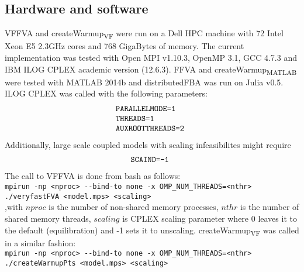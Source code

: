 \subsection*{Hardware and software}
VFFVA and createWarmup\textsubscript{VF} were run on a Dell HPC machine with 72 Intel Xeon E5 2.3GHz cores and 768 GigaBytes of memory. The current implementation was tested with Open MPI v1.10.3, OpenMP 3.1, GCC 4.7.3 and IBM ILOG CPLEX academic version (12.6.3). FFVA and createWarmup\textsubscript{MATLAB} were tested with MATLAB 2014b and distributedFBA was run on Julia v0.5. ILOG CPLEX was called with the following parameters:
\begin{equation*} \label{eq:one}
\begin{array}{ll@{}ll}
\texttt{PARALLELMODE=1} &\\
\texttt{THREADS=1} &\\
\texttt{AUXROOTTHREADS=2} &\\
\end{array}
\end{equation*}
Additionally, large scale coupled models with scaling infeasibilites might require 
\begin{equation*} \label{eq:one}
\begin{array}{ll@{}ll}
\texttt{SCAIND=-1} &\\
\end{array}
\end{equation*}
The call to VFFVA is done from bash as follows:\\
\texttt{mpirun -np \textless nproc\textgreater \hspace{0.1cm} -\hspace{0.05cm}-bind-to none -x OMP\_NUM\_THREADS=\textless nthr\textgreater \hspace{0.1cm} ./veryfastFVA \textless model.mps\textgreater \hspace{0.1cm} \textless scaling\textgreater}\\
,with $nproc$ is the number of non-shared memory processes, $nthr$ is the number of shared memory threads, $scaling$ is CPLEX scaling parameter where 0 leaves it to the default (equilibration) and -1 sets it to unscaling. createWarmup\textsubscript{VF} was called in a similar fashion:\\
\texttt{mpirun -np \textless nproc\textgreater \hspace{0.1cm}  -\hspace{0.05cm}-bind-to none -x OMP\_NUM\_THREADS=\textless nthr\textgreater \hspace{0.1cm}\\ ./createWarmupPts \textless model.mps\textgreater \hspace{0.1cm} \textless scaling\textgreater}\\
